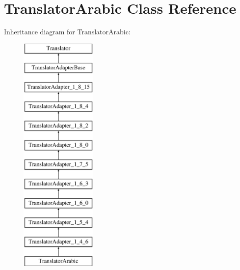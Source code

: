 \hypertarget{class_translator_arabic}{}\section{Translator\+Arabic Class Reference}
\label{class_translator_arabic}
Inheritance diagram for Translator\+Arabic\+:\begin{figure}[H]
\begin{center}
\leavevmode
\includegraphics[height=12.000000cm]{class_translator_arabic}
\end{center}
\end{figure}
